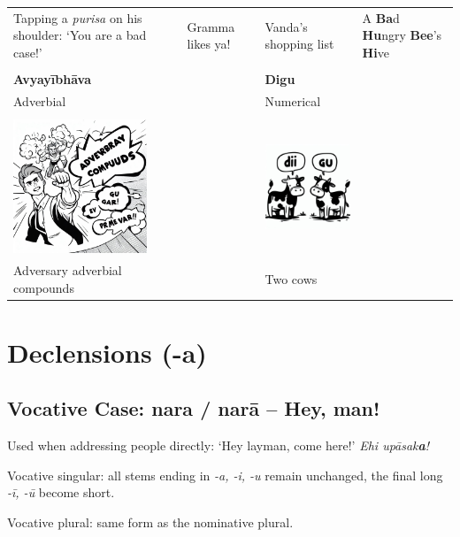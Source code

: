 \documentclass[11pt,oneside]{memoir}
\begin{document}
\begin{longtable}{L{4cm} L{4cm} L{4cm} L{4cm}}
Tapping a \emph{purisa} on his shoulder: `You are a bad case!' & Gramma likes ya! & Vanda's shopping list & A \textbf{Ba}d \textbf{Hu}ngry \textbf{Bee}'s \textbf{Hi}ve\\[0pt]
 &  &  & \\[0pt]
\textbf{Avyayībhāva} &  & \textbf{Digu} & \\[0pt]
Adverbial &  & Numerical & \\[0pt]
 &  &  & \\[0pt]
\includegraphics[width=4cm]{./images/adverbial-compounds.jpeg} &  & \includegraphics[width=4cm]{./images/two-cows-dii-gu.jpeg} & \\[0pt]
Adversary adverbial compounds &  & Two cows & \\[0pt]
\end{longtable}

\clearpage

\section{Declensions (-a)}
\label{sec:orgca89d83}
\subsection{Vocative Case: nara / narā -- Hey, man!}
\label{sec:org02bc4b0}

Used when addressing people directly: `Hey layman, come here!' \emph{Ehi upāsak\textbf{a}!}

Vocative singular: all stems ending in \emph{-a, -i, -u} remain unchanged, the final long \emph{-ī, -ū} become short.

Vocative plural: same form as the nominative plural.
\end{document}
